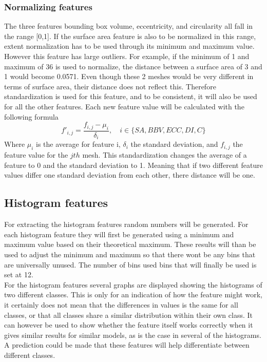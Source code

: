 \documentclass{bigdata}
\begin{document}
\subsubsection{Normalizing  features}
The three features bounding box volume, eccentricity, and circularity all fall in the range [0,1]. If the surface area feature is also to be normalized in this range, extent normalization has to be used through its minimum and maximum value. However this feature has large outliers. For example, if the minimum of 1 and maximum of 36 is used to normalize, the distance between a surface area of 3 and 1 would become 0.0571. Even though these 2 meshes would be very different in terms of surface area, their distance does not reflect this. Therefore standardization is used for this feature, and to be consistent, it will also be used for all the other  features. 
Each new feature value will be calculated with the following formula
\begin{equation}
f'_{i,j} = \frac{f_{i,j} - \mu_i}{\delta_i},\quad i \in \{SA,BBV,ECC,DI,C\}
\end{equation}
Where $\mu_i$ is the average for feature i, $\delta_i$ the standard deviation, and $f_{i,j}$ the feature value for the $jth$ mesh. This standardization changes the average of a feature to 0 and the standard deviation to 1. Meaning that if two different feature values differ one standard deviation from each other, there distance will be one. 

\subsection{Histogram features}
For extracting the histogram features random numbers will be generated. 
For each histogram feature they will first be generated using a minimum and maximum value based on their theoretical maximum. These results will than be used to adjust the minimum and maximum so that there wont be any bins that are universally unused. The number of bins used bins that will finally be used is set at 12.\\
For the histogram features several graphs are displayed showing the histograms of two different classes. This is only for an indication of how the feature might work, it certainly does not mean that the differences in values is the same for all classes, or that all classes share a similar distribution within their own class. It can however be used to show whether the feature itself works correctly when it gives similar results for similar models, as is the case in several of the histograms. A prediction could be made that these features will help differentiate between different classes. 
\end{document}
